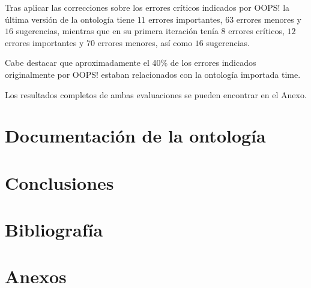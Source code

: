 \documentclass[a4paper,12pt]{article}
\begin{document}
	Tras aplicar las correcciones sobre los errores críticos indicados por OOPS! la última versión de la ontología tiene $11$ errores importantes, $63$ errores menores y $16$ sugerencias, mientras que en su primera iteración tenía $8$ errores críticos, $12$ errores importantes y $70$ errores menores, así como $16$ sugerencias.
	
	Cabe destacar que aproximadamente el 40\% de los errores indicados originalmente por OOPS! estaban relacionados con la ontología importada time.
	
	Los resultados completos de ambas evaluaciones se pueden encontrar en el Anexo.
	
	\section{Documentación de la ontología}
	
	
		
	\cite{widoco}
	
	
	\section{Conclusiones}
	
	
\newpage
	\section*{Bibliografía}
	
	
	
	\newpage
	\section*{Anexos}
	
\end{document}
